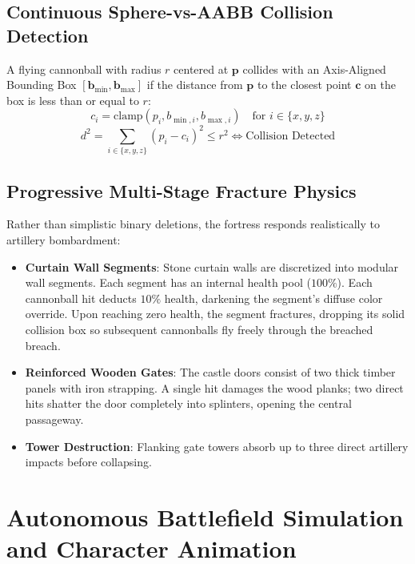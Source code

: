 \documentclass[11pt,a4paper]{article}
\begin{document}
\subsection{Continuous Sphere-vs-AABB Collision Detection}
A flying cannonball with radius $r$ centered at $\mathbf{p}$ collides with an Axis-Aligned Bounding Box $[\mathbf{b}_{\min}, \mathbf{b}_{\max}]$ if the distance from $\mathbf{p}$ to the closest point $\mathbf{c}$ on the box is less than or equal to $r$:
\begin{equation}
  c_i = \text{clamp}(p_i, b_{\min, i}, b_{\max, i}) \quad \text{for } i \in \{x, y, z\}
\end{equation}
\begin{equation}
  d^2 = \sum_{i \in \{x,y,z\}} (p_i - c_i)^2 \le r^2 \iff \text{Collision Detected}
\end{equation}

\subsection{Progressive Multi-Stage Fracture Physics}
Rather than simplistic binary deletions, the fortress responds realistically to artillery bombardment:
\begin{itemize}[itemsep=2pt,topsep=2pt]
  \item \textbf{Curtain Wall Segments}: Stone curtain walls are discretized into modular wall segments. Each segment has an internal health pool ($100\%$). Each cannonball hit deducts $10\%$ health, darkening the segment's diffuse color override. Upon reaching zero health, the segment fractures, dropping its solid collision box so subsequent cannonballs fly freely through the breached breach.
  \item \textbf{Reinforced Wooden Gates}: The castle doors consist of two thick timber panels with iron strapping. A single hit damages the wood planks; two direct hits shatter the door completely into splinters, opening the central passageway.
  \item \textbf{Tower Destruction}: Flanking gate towers absorb up to three direct artillery impacts before collapsing.
\end{itemize}

\section{Autonomous Battlefield Simulation and Character Animation}
\end{document}
